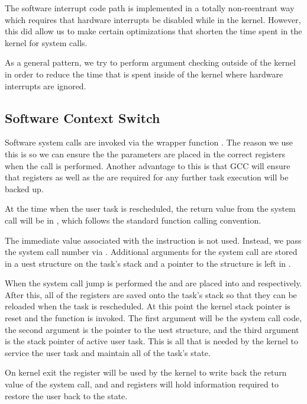 \documentclass[pdftex,10pt,a4paper]{article}
\begin{document}
The software interrupt code path is implemented in a totally
non-reentrant way which requires that hardware interrupts be disabled
while in the kernel. However, this did allow us to make certain
optimizations that shorten the time spent in the kernel for system calls.

As a general pattern, we try to perform argument checking outside of
the kernel in order to reduce the time that is spent inside of the
kernel where hardware interrupts are ignored.

\subsection*{Software Context Switch}

Software system calls are invoked via the wrapper function
. The reason we use this is so we can ensure the the
parameters are placed in the correct registers when the  call
is performed. Another advantage to this is that GCC will ensure that
registers  as well as the  are required for any further
task execution will be backed up.

At the time when the user task is rescheduled, the return value from
the system call will be in , which follows the standard
function calling convention.

The immediate value associated with the  instruction is not
used. Instead, we pass the system call number via . Additional
arguments for the system call are stored in a uest
structure on the task's stack and a pointer to the structure is left
in .

When the system call jump is performed the  and  are
placed into  and  respectively. After this, all of the
registers are saved onto the task's stack so that they can be reloaded
when the task is rescheduled. At this point the kernel stack pointer
is reset and the function  is invoked. The first
argument will be the system call code, the second argument is the
pointer to the uest structure, and the third argument
is the stack pointer of active user task. This is all that is needed
by the kernel to service the user task and maintain all of the task's
state.

On kernel exit the  register will be used by the kernel to write
back the return value of the system call, and  and 
registers will hold information required to restore the user back to
the state.
\end{document}

